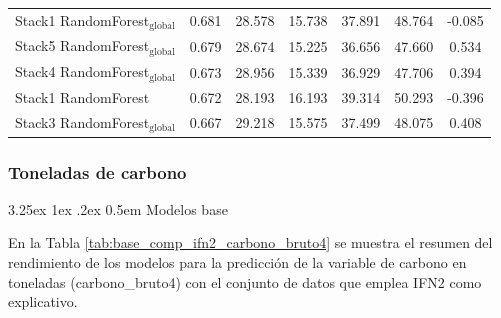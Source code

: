 \documentclass[a4paper,twocolumn]{article}
\makeatletter
\renewcommand\paragraph{\@startsection{paragraph}{4}{\z@}%
  {3.25ex \@plus1ex \@minus.2ex}%
  {0.5em}%
  {\normalfont\normalsize\bfseries}}
\newcommand{\subsubsubsection}[1]{\paragraph{#1}}
\makeatother
\begin{document}
\begin{table}
{\begin{tabular}{p{4.5cm}cccccc}
        Stack1 RandomForest$_{\text{global}}$ & 0.681 & 28.578 & 15.738 & 37.891 & 48.764 & -0.085 \\
        Stack5 RandomForest$_{\text{global}}$ & 0.679 & 28.674 & 15.225 & 36.656 & 47.660 & 0.534 \\
        Stack4 RandomForest$_{\text{global}}$ & 0.673 & 28.956 & 15.339 & 36.929 & 47.706 & 0.394 \\
        Stack1 RandomForest & 0.672 & 28.193 & 16.193 & 39.314 & 50.293 & -0.396 \\
        Stack3 RandomForest$_{\text{global}}$ & 0.667 & 29.218 & 15.575 & 37.499 & 48.075 & 0.408 \\
            \bottomrule
    \end{tabular}
    }
\end{table}

\subsubsection{Toneladas de carbono}

\subsubsubsection{Modelos base}

En la Tabla \ref{tab:base_comp_ifn2_carbono_bruto4} se muestra el resumen del rendimiento de los modelos para la predicción de la variable de carbono en toneladas (carbono\_bruto4) con el conjunto de datos que emplea IFN2 como explicativo.
\end{document}
